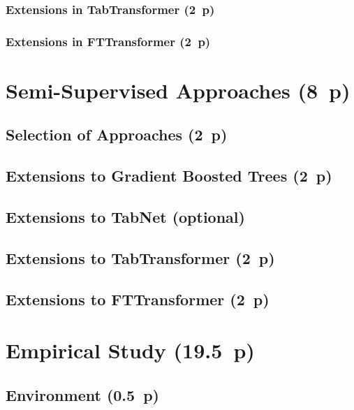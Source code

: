 \subsubsection{Extensions in
  TabTransformer (2~p)}\label{sec:extensions-in-tabtransformer}

  \subsubsection{Extensions in
  FTTransformer (2~p)}\label{sec:extensions-in-tabtransformer}


\newpage
\section{Semi-Supervised Approaches (8~p)}\label{sec:semi-supervised-approaches}

\subsection{Selection of Approaches (2~p)}\label{sec:selection-of-approaches-1}

\subsection{Extensions to Gradient Boosted
  Trees (2~p)}\label{sec:extensions-to-gradient-boosted-trees}

\subsection{Extensions to TabNet (optional)}\label{sec:extensions-to-tabnet}

\subsection{Extensions to TabTransformer (2~p)}\label{sec:extensions-to-tabtransformer}

\subsection{Extensions to FTTransformer (2~p)}\label{sec:extensions-to-fttransformer}


\newpage
\section{Empirical Study (19.5~p)}\label{sec:empirical-study}

\subsection{Environment (0.5~p)}\label{sec:environment}

